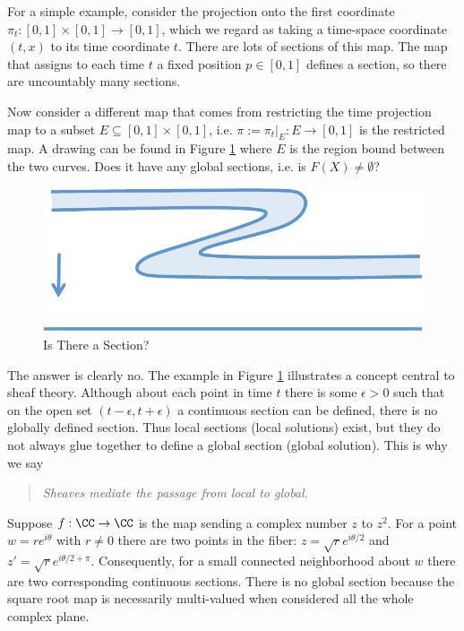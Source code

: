\begin{ex}
For a simple example, consider the projection onto the first coordinate $\pi_t:[0,1]\times [0,1]\to [0,1]$, which we regard as taking a time-space coordinate $(t,x)$ to its time coordinate $t$. There are lots of sections of this map. The map that assigns to each time $t$ a fixed position $p\in[0,1]$ defines a section, so there are uncountably many sections.

Now consider a different map that comes from restricting the time projection map to a subset $E\subseteq [0,1]\times[0,1]$, i.e. $\pi:=\pi_t|_E:E\to[0,1]$ is the restricted map. A drawing can be found in Figure \ref{fig:evade_sec} where $E$ is the region bound between the two curves. Does it have any global sections, i.e. is $F(X)\neq\emptyset$?
\end{ex}

\begin{figure}[ht]
\centering
\includegraphics[width=.7\textwidth]{evade_sketch.pdf}
\caption{Is There a Section?}
\label{fig:evade_sec}
\end{figure}

The answer is clearly no. The example in Figure \ref{fig:evade_sec} illustrates a concept central to sheaf theory. Although about each point in time $t$ there is some $\epsilon>0$ such that on the open set $(t-\epsilon,t+\epsilon)$ a continuous section can be defined, there is no globally defined section. Thus local sections (local solutions) exist, but they do not always glue together to define a global section (global solution). This is why we say
\begin{quote}
	\begin{center}
	\emph{Sheaves mediate the passage from local to global.}
\end{center}
\end{quote}

\begin{ex}
	Suppose $f:\CC\to\CC$ is the map sending a complex number $z$ to $z^2$. For a  point $w=re^{i\theta}$ with $r\neq 0$ there are two points in the fiber: $z=\sqrt{r}e^{i\theta/2}$ and $z'=\sqrt{r}e^{i\theta/2 +\pi}$. Consequently, for a small connected neighborhood about $w$ there are two corresponding continuous sections. There is no global section because the square root map is necessarily multi-valued when considered all the whole complex plane.
\end{ex}

